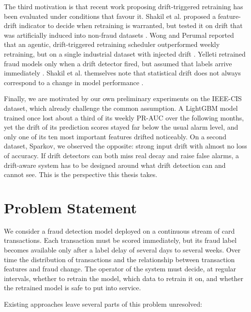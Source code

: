 The third motivation is that recent work proposing drift-triggered retraining has been evaluated under conditions that favour it. Shakil et al. proposed a feature-drift indicator to decide when retraining is warranted, but tested it on drift that was artificially induced into non-fraud datasets \cite{shakil2025}. Wong and Perumal reported that an agentic, drift-triggered retraining scheduler outperformed weekly retraining, but on a single industrial dataset with injected drift \cite{wong2025}. Yelleti retrained fraud models only when a drift detector fired, but assumed that labels arrive immediately \cite{yelleti2025}. Shakil et al. themselves note that statistical drift does not always correspond to a change in model performance \cite{shakil2025}.

Finally, we are motivated by our own preliminary experiments on the IEEE-CIS dataset, which already challenge the common assumption. A LightGBM model trained once lost about a third of its weekly PR-AUC over the following months, yet the drift of its prediction scores stayed far below the usual alarm level, and only one of its ten most important features drifted noticeably. On a second dataset, Sparkov, we observed the opposite: strong input drift with almost no loss of accuracy. If drift detectors can both miss real decay and raise false alarms, a drift-aware system has to be designed around what drift detection can and cannot see. This is the perspective this thesis takes.

\section{Problem Statement}

We consider a fraud detection model deployed on a continuous stream of card transactions. Each transaction must be scored immediately, but its fraud label becomes available only after a label delay of several days to several weeks. Over time the distribution of transactions and the relationship between transaction features and fraud change. The operator of the system must decide, at regular intervals, whether to retrain the model, which data to retrain it on, and whether the retrained model is safe to put into service.

Existing approaches leave several parts of this problem unresolved:

